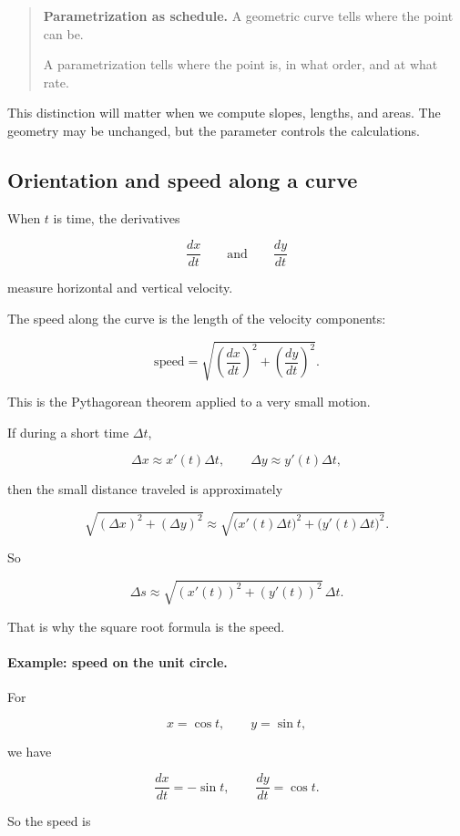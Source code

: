 \begin{quote}
\textbf{Parametrization as schedule.}
A geometric curve tells where the point can be.

A parametrization tells where the point is, in what order, and at what rate.
\end{quote}

This distinction will matter when we compute slopes, lengths, and areas.  The geometry
may be unchanged, but the parameter controls the calculations.

\subsection{Orientation and speed along a curve}
\label{subsec:orientation-speed-along-curve}

When \(t\) is time, the derivatives

\[
\frac{dx}{dt}
\qquad\text{and}\qquad
\frac{dy}{dt}
\]

measure horizontal and vertical velocity.

The speed along the curve is the length of the velocity components:

\[
\boxed{
\text{speed}
=
\sqrt{\left(\frac{dx}{dt}\right)^2+\left(\frac{dy}{dt}\right)^2}.
}
\]

This is the Pythagorean theorem applied to a very small motion.

If during a short time \(\Delta t\),

\[
\Delta x\approx x'(t)\Delta t,
\qquad
\Delta y\approx y'(t)\Delta t,
\]

then the small distance traveled is approximately

\[
\sqrt{(\Delta x)^2+(\Delta y)^2}
\approx
\sqrt{\bigl(x'(t)\Delta t\bigr)^2+\bigl(y'(t)\Delta t\bigr)^2}.
\]

So

\[
\Delta s
\approx
\sqrt{(x'(t))^2+(y'(t))^2}\,\Delta t.
\]

That is why the square root formula is the speed.

\paragraph{Example: speed on the unit circle.}
For

\[
x=\cos t,
\qquad
y=\sin t,
\]

we have

\[
\frac{dx}{dt}=-\sin t,
\qquad
\frac{dy}{dt}=\cos t.
\]

So the speed is

